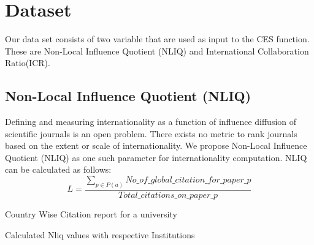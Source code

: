 \documentclass{article}
\begin{document}
\color{black}
\section{Dataset}
Our data set consists of two variable that are used as input to the CES function. These are Non-Local Influence Quotient (NLIQ) and International Collaboration Ratio(ICR).

\subsection{Non-Local Influence Quotient (NLIQ)}
Defining and measuring internationality as a function of influence diffusion of scientific journals is an open
problem. There exists no metric to rank journals based on the extent or scale of internationality. We propose 
Non-Local Influence Quotient (NLIQ) as one such parameter for internationality computation. NLIQ can be calculated as follows:  
\vspace{1em}
\begin{equation*}
L = \frac{\sum_{p\in P(a)}^{}No\_of\_global\_citation\_for\_paper\_p}{Total\_citations\_on\_paper\_p}
\end{equation*}

\vspace{3em}
\vspace{1em}
\item Country Wise Citation report for a university 
 
 \vspace{2em}
\vspace{1em}
\item Calculated Nliq values with respective Institutions
\end{document}
